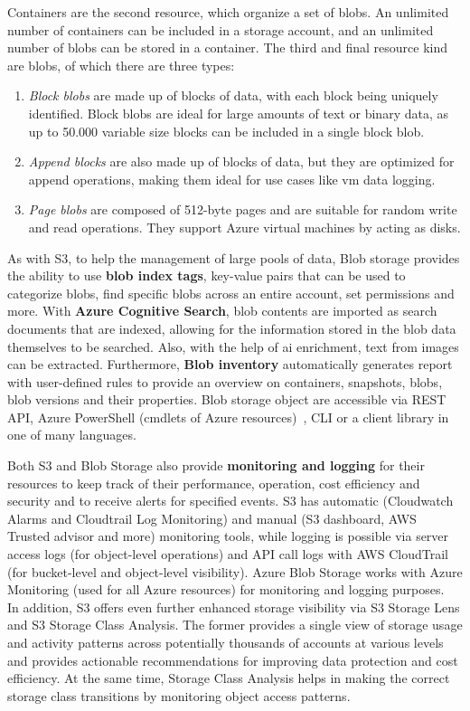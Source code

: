 Containers are the second resource, which organize a set of blobs. An unlimited number of containers can be included in a storage account, and an unlimited number of blobs can be stored in a container. The third and final resource kind are blobs, of which there are three types:

\begin{enumerate}
    \item \textit{Block blobs} are made up of blocks of data, with each block being uniquely identified. Block blobs are ideal for large amounts of text or binary data, as up to 50.000 variable size blocks can be included in a single block blob.

    \item \textit{Append blocks} are also made up of blocks of data, but they are optimized for append operations, making them ideal for use cases like \ac{vm} data logging.

    \item \textit{Page blobs}  are composed of 512-byte pages and are suitable for random write and read operations. They support Azure virtual machines by acting as disks.
\end{enumerate}

As with S3, to help the management of large pools of data, Blob storage provides the ability to use \textbf{blob index tags}, key-value pairs that can be used to categorize blobs, find specific blobs across an entire account, set permissions and more. With \textbf{Azure Cognitive Search}, blob contents are imported as search documents that are indexed, allowing for the information stored in the blob data themselves to be searched. Also, with the help of \ac{ai} enrichment, text from images can be extracted. Furthermore,  \textbf{Blob inventory} automatically generates report with user-defined rules to provide an overview on containers, snapshots, blobs, blob versions and their properties. Blob storage object are accessible via REST API, Azure PowerShell (cmdlets of Azure resources)~\cite{powershell}, CLI or a client library in one of many languages.~\cite{blobinfo}

Both S3 and Blob Storage also provide\textbf{ monitoring and logging} for their resources to keep track of their performance, operation, cost efficiency and security and to receive alerts for specified events. S3 has automatic (Cloudwatch Alarms and Cloudtrail Log Monitoring) and manual (S3 dashboard, AWS Trusted advisor and more) monitoring tools, while logging is possible via server access logs (for object-level operations) and API call logs with AWS CloudTrail (for bucket-level and object-level visibility). Azure Blob Storage works with Azure Monitoring (used for all Azure resources) for monitoring and logging purposes.~\cite{s3monitoring,blobmonitoring} In addition, S3 offers even further enhanced storage visibility via S3 Storage Lens and S3 Storage Class Analysis. The former provides a single view of storage usage and activity patterns across potentially thousands of accounts at various levels and provides actionable recommendations for improving data protection and cost efficiency. At the same time, Storage Class Analysis helps in making the correct storage class transitions by monitoring object access patterns.~\cite{s3analytics}

